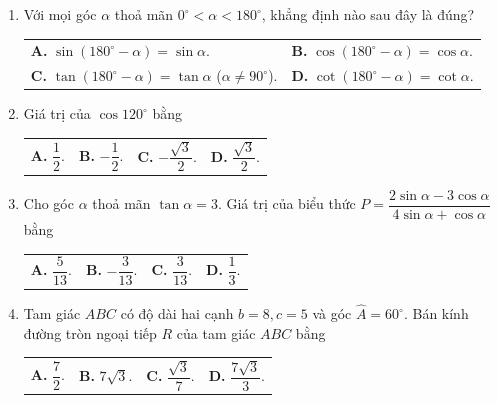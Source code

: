 \documentclass[12pt,a4paper]{article}
\makeatletter
\newcommand{\four}[4]{\par\noindent\begin{tabularx}{\linewidth}{@{}*{4}{>{\raggedright\arraybackslash}X}@{}}\textbf{A.} #1&\textbf{B.} #2&\textbf{C.} #3&\textbf{D.} #4\end{tabularx}}
\newcommand{\two}[4]{\par\noindent\begin{tabularx}{\linewidth}{@{}*{2}{>{\raggedright\arraybackslash}X}@{}}\textbf{A.} #1&\textbf{B.} #2\\[3.8pt]\textbf{C.} #3&\textbf{D.} #4\end{tabularx}}
\makeatother
\begin{document}
\begin{enumerate}
\item Với mọi góc $\alpha$ thoả mãn $0^\circ < \alpha < 180^\circ$, khẳng định nào sau đây là đúng?
\two{$\sin(180^\circ - \alpha) = \sin \alpha$.}{$\cos(180^\circ - \alpha) = \cos \alpha$.}{$\tan(180^\circ - \alpha) = \tan \alpha$ ($\alpha \ne 90^\circ$).}{$\cot(180^\circ - \alpha) = \cot \alpha$.}

\item Giá trị của $\cos 120^\circ$ bằng
\four{$\dfrac{1}{2}$.}{$-\dfrac{1}{2}$.}{$-\dfrac{\sqrt{3}}{2}$.}{$\dfrac{\sqrt{3}}{2}$.}

\item Cho góc $\alpha$ thoả mãn $\tan \alpha = 3$. Giá trị của biểu thức $P = \dfrac{2\sin \alpha - 3\cos \alpha}{4\sin \alpha + \cos \alpha}$ bằng
\four{$\dfrac{5}{13}$.}{$-\dfrac{3}{13}$.}{$\dfrac{3}{13}$.}{$\dfrac{1}{3}$.}

\item Tam giác $ABC$ có độ dài hai cạnh $b = 8, c = 5$ và góc $\widehat{A} = 60^\circ$. Bán kính đường tròn ngoại tiếp $R$ của tam giác $ABC$ bằng
\four{$\dfrac{7}{2}$.}{$7\sqrt{3}$.}{$\dfrac{\sqrt{3}}{7}$.}{$\dfrac{7\sqrt{3}}{3}$.}
\end{enumerate}
\newpage
\end{document}
